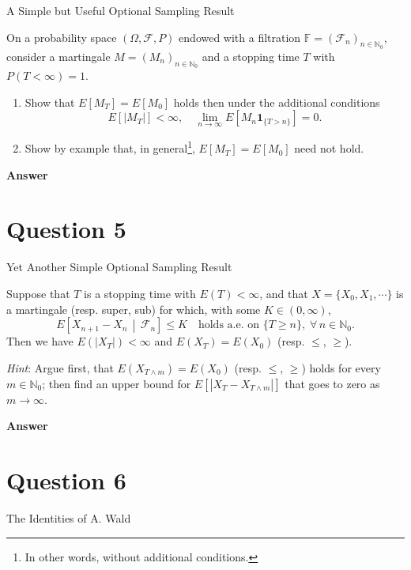\documentclass[letterpaper]{article}
\begin{document}
		
		{\color{deepred} A Simple but Useful Optional Sampling Result}
		
		 On a probability space $(\Omega, \mathcal{F}, P)$ endowed with a filtration $\mathbb{F} = (\mathcal{F}_n)_{n \in \mathbb{N}_0}$, consider a martingale $M = (M_n)_{n \in \mathbb{N}_0}$ and a stopping time $T$ with $P(T < \infty) = 1$.
		\begin{enumerate}
			\item[(a)] Show that $E\left[M_T\right] = E\left[M_0\right]$ holds then under the additional conditions
			\[
			E\left[|M_T|\right] < \infty, \quad \lim_{n \to \infty} E\left[M_n \mathbf{1}_{\{T > n\}}\right] = 0.
			\]
			\item[(b)] Show by example that, in general\footnote{ In other words, without additional conditions.}, $E\left[M_T\right] = E\left[M_0\right]$ need not hold.
		\end{enumerate}
		
		\textbf{Answer}
		
		\clearpage
		
		\section{Question 5}
		
		
		{\color{deepred} Yet Another Simple Optional Sampling Result}
		
		 Suppose that $T$ is a stopping time with $E(T) < \infty$, and that $X = \{X_0, X_1, \cdots\}$ is a martingale (resp. super, sub) for which, with some $K \in (0, \infty)$,
	\[
E\left[X_{n+1} - X_n \,\middle|\, \mathcal{F}_n\right] \leq K \quad \text{holds a.e. on } \{T \geq n\}, \; \forall\, n \in \mathbb{N}_0.
\]
        Then we have $E(|X_T|) < \infty$ and $E(X_T) = E(X_0)$ (resp. $\leq$, $\geq$).

\smallskip
 \textit{Hint}: Argue first, that $E(X_{T \wedge m}) = E(X_0)$ (resp. $\leq$, $\geq$) holds for every $m \in \mathbb{N}_0$; then find an upper bound for $E\left[|X_T - X_{T \wedge m}|\right]$ that goes to zero as $m \to \infty$.

		
		\textbf{Answer}
		
		\clearpage
		
		\section{Question 6}
		
		
		{\color{deepred} The Identities of A. Wald} 
		
\end{document}
